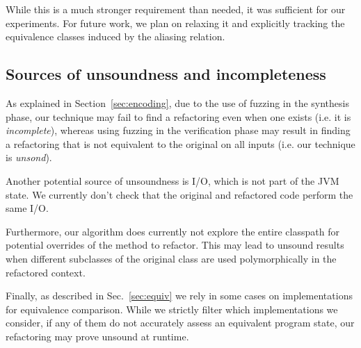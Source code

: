 \documentclass[sigconf,review,anonymous]{acmart}
\begin{document}
While this is a much stronger requirement than needed, it was sufficient for our experiments.
For future work, we plan on relaxing it and explicitly tracking the equivalence classes induced by the aliasing
relation.




\subsection{Sources of unsoundness and incompleteness}
As explained in Section~\ref{sec:encoding}, due to the use of fuzzing in the synthesis
phase, our technique may fail to find a refactoring even when one
exists (i.e. it is {\em incomplete}), whereas using fuzzing in the verification phase may result in finding a refactoring that is not equivalent to the original on all
inputs (i.e. our technique is {\em unsond}).

Another potential source of unsoundness is I/O,
which is not part of the JVM state. We currently don't check
that the original and refactored code perform the same I/O.

Furthermore, our algorithm does currently not explore the entire classpath for
potential overrides of the method to refactor. This may lead to unsound results
when different subclasses of the original class are used polymorphically in the
refactored context.

Finally, as described in Sec.~\ref{sec:equiv} we rely in some cases on 
implementations for equivalence comparison. While we strictly filter which 
implementations we consider, if any of them do not accurately assess an equivalent program state, 
our refactoring may prove unsound at runtime.
\end{document}
